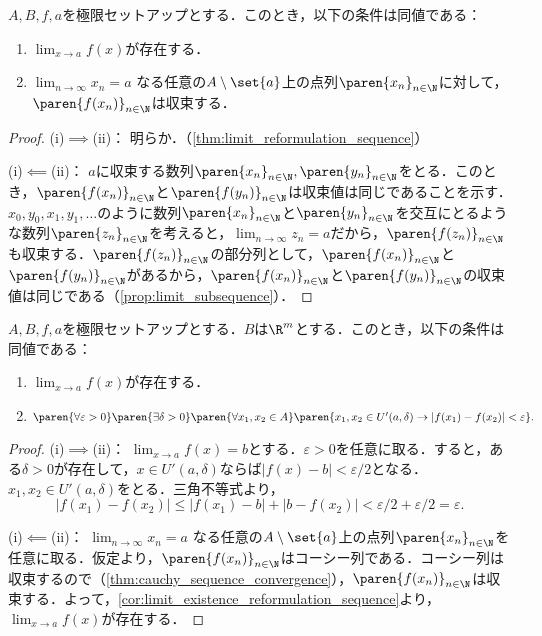 \documentclass[a4paper,10pt]{ltjsarticle}
\begin{document}
\begin{MyCorollary}
  \(A, B, f, a\)を極限セットアップとする．このとき，以下の条件は同値である：
  \begin{enumerate}
    \item \(\lim_{x\to a}f(x)\)が存在する．
    \item \(\lim_{n\to\infty}x_n=a\) なる任意の\(A\setminus\set{a}\)上の点列\(\paren{x_n}_{n\in\N}\)に対して，\(\paren{f(x_n)}_{n\in\N}\)は収束する．
  \end{enumerate}
\end{MyCorollary}
\begin{proof}
  (i)\(\implies\)(ii)： 明らか．（\cref{thm:limit_reformulation_sequence}）

  (i)\(\impliedby\)(ii)： \(a\)に収束する数列\(\paren{x_n}_{n\in\N}, \paren{y_n}_{n\in\N}\)をとる．このとき，\(\paren{f(x_n)}_{n\in\N}\)と\(\paren{f(y_n)}_{n\in\N}\)は収束値は同じであることを示す．\(x_0, y_0, x_1, y_1, \dots\)のように数列\(\paren{x_n}_{n\in\N}\)と\(\paren{y_n}_{n\in\N}\)を交互にとるような数列\(\paren{z_n}_{n\in\N}\)を考えると，\(\lim_{n\to\infty}z_n=a\)だから，\(\paren{f(z_n)}_{n\in\N}\)も収束する．\(\paren{f(z_n)}_{n\in\N}\)の部分列として，\(\paren{f(x_n)}_{n\in\N}\)と\(\paren{f(y_n)}_{n\in\N}\)があるから，\(\paren{f(x_n)}_{n\in\N}\)と\(\paren{f(y_n)}_{n\in\N}\)の収束値は同じである（\cref{prop:limit_subsequence}）．
\end{proof}

\begin{MyTheorem}
  \(A, B, f, a\)を極限セットアップとする．\(B\)は\(\R^m\)とする．このとき，以下の条件は同値である：
  \begin{enumerate}
    \item \(\lim_{x\to a}f(x)\)が存在する．
    \item \(\paren{\forall \varepsilon > 0}\paren{\exists \delta > 0}\paren{\forall x_1, x_2 \in A}\paren{x_1, x_2 \in U'(a, \delta) \to |f(x_1) - f(x_2)| < \varepsilon}.\)
  \end{enumerate}
\end{MyTheorem}
\begin{proof}
  (i)\(\implies\)(ii)： \(\lim_{x\to a}f(x) = b\)とする．\(\varepsilon > 0\)を任意に取る．すると，ある\(\delta > 0\)が存在して，\(x \in U'(a, \delta)\)ならば\(|f(x) - b| < \varepsilon/2\)となる．\(x_1, x_2 \in U'(a, \delta)\)をとる．三角不等式より，
  \[ |f(x_1) - f(x_2)| \le |f(x_1) - b| + |b - f(x_2)| < \varepsilon/2 + \varepsilon/2 = \varepsilon.\]

  (i)\(\impliedby\)(ii)： \(\lim_{n\to\infty}x_n=a\) なる任意の\(A\setminus\set{a}\)上の点列\(\paren{x_n}_{n\in\N}\)を任意に取る．仮定より，\(\paren{f(x_n)}_{n\in\N}\)はコーシー列である．コーシー列は収束するので（\cref{thm:cauchy_sequence_convergence}），\(\paren{f(x_n)}_{n\in\N}\)は収束する．よって，\cref{cor:limit_existence_reformulation_sequence}より，\(\lim_{x\to a}f(x)\)が存在する．
\end{proof}
\end{document}
